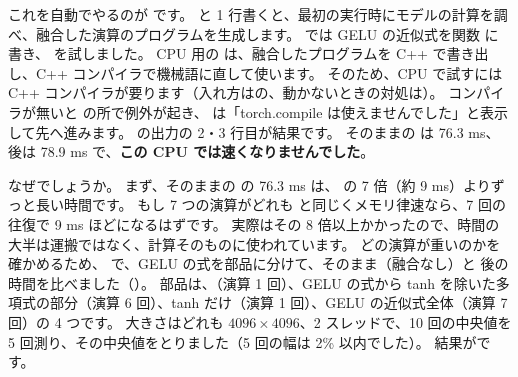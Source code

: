 これを自動でやるのが  です。
 と 1 行書くと、最初の実行時にモデルの計算を調べ、融合した演算のプログラムを生成します。
 では GELU の近似式を関数  に書き、 を試しました。
CPU 用の  は、融合したプログラムを C++ で書き出し、C++ コンパイラで機械語に直して使います。
そのため、CPU で試すには C++ コンパイラが要ります（入れ方はの、動かないときの対処は）。
コンパイラが無いと  の所で例外が起き、 は「torch.compile は使えませんでした」と表示して先へ進みます。
の出力の 2・3 行目が結果です。
そのままの  は 76.3 ms、 後は 78.9 ms で、\textbf{この CPU では速くなりませんでした}。

なぜでしょうか。
まず、そのままの  の 76.3 ms は、 の 7 倍（約 9 ms）よりずっと長い時間です。
もし 7 つの演算がどれも  と同じくメモリ律速なら、7 回の往復で 9 ms ほどになるはずです。
実際はその 8 倍以上かかったので、時間の大半は運搬ではなく、計算そのものに使われています。
どの演算が重いのかを確かめるため、 で、GELU の式を部品に分けて、そのまま（融合なし）と  後の時間を比べました（）。
部品は、（演算 1 回）、GELU の式から tanh を除いた多項式の部分（演算 6 回）、tanh だけ（演算 1 回）、GELU の近似式全体（演算 7 回）の 4 つです。
大きさはどれも $4096\times4096$、2 スレッドで、10 回の中央値を 5 回測り、その中央値をとりました（5 回の幅は 2\% 以内でした）。
結果がです。


